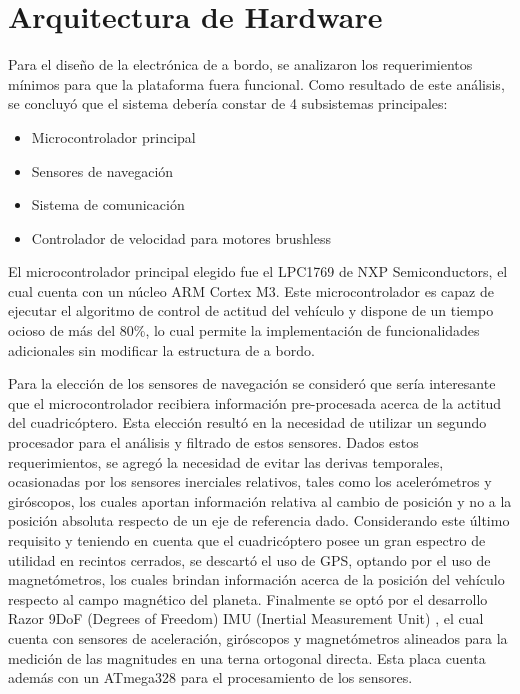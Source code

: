 \documentclass[a4paper, conference]{IEEEtran}
\begin{document}
\section{Arquitectura de Hardware}

Para el diseño de la electrónica de a bordo, se analizaron los requerimientos mínimos para que la plataforma fuera funcional. Como resultado de este análisis, se concluyó que el sistema debería constar de 4 subsistemas principales: 
\begin{itemize}
\item Microcontrolador principal
\item Sensores de navegación 
\item Sistema de comunicación
\item Controlador de velocidad para motores brushless
\end{itemize}
	
El microcontrolador principal elegido fue el LPC1769 de NXP Semiconductors, el cual cuenta con un núcleo ARM Cortex M3.  Este microcontrolador es capaz de ejecutar el algoritmo de control de actitud del vehículo y dispone de un tiempo ocioso de más del 80\%, lo cual permite la implementación de funcionalidades adicionales sin modificar la estructura de a bordo.

Para la elección de los sensores de navegación se consideró que sería interesante que el microcontrolador recibiera información pre-procesada acerca de la actitud del cuadricóptero. Esta elección resultó en la necesidad de utilizar un segundo procesador para el análisis y filtrado de estos sensores. Dados estos requerimientos, se agregó la necesidad de evitar las derivas temporales, ocasionadas por los sensores inerciales relativos, tales como los acelerómetros y giróscopos, los cuales aportan información relativa al cambio de posición y no a la posición absoluta respecto de un eje de referencia dado. Considerando este último requisito y teniendo en cuenta que el cuadricóptero posee un gran espectro de utilidad en recintos cerrados, se descartó el uso de GPS, optando por el uso de magnetómetros, los cuales brindan información acerca de la posición del vehículo respecto al campo magnético del planeta. Finalmente se optó por el desarrollo Razor 9DoF (Degrees of Freedom) IMU (Inertial Measurement Unit) \cite{razor9d0f}, el cual cuenta con sensores de aceleración, giróscopos y magnetómetros alineados para la medición de las magnitudes en una terna ortogonal directa. Esta placa cuenta además con un ATmega328 para el procesamiento de los sensores.
\end{document}
